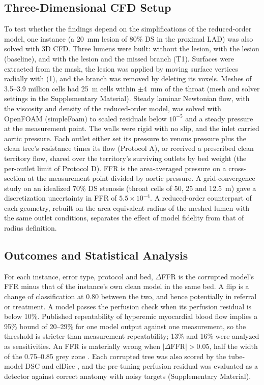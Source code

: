 \documentclass[journal,twoside,web]{ieeecolor}
\begin{document}
\subsection{Three-Dimensional CFD Setup}
To test whether the findings depend on the simplifications of the reduced-order model, one instance (a 20~mm lesion
of 80\% DS in the proximal LAD) was also solved with 3D CFD. Three lumens were built: without the lesion, with the lesion (baseline), and with the
lesion and the missed branch (T1). Surfaces were extracted from the mask, the
lesion was applied by moving surface vertices radially with (1), and the branch was removed by deleting its voxels.
Meshes of 3.5--3.9 million cells had 25~\textmu m cells within $\pm 4$~mm of the throat (mesh and solver settings in the Supplementary Material).
Steady laminar Newtonian flow, with the viscosity and density of the reduced-order model, was solved with OpenFOAM
(simpleFoam) to scaled residuals below $10^{-5}$ and a steady pressure at the measurement
point. The walls were rigid with no slip, and the inlet carried aortic pressure. Each outlet either set its pressure
to venous pressure plus the clean tree's resistance times its flow (Protocol A), or received a prescribed clean
territory flow, shared over the territory's surviving outlets by bed weight (the per-outlet limit of Protocol D). FFR
is the area-averaged pressure on a cross-section at the measurement point divided by aortic pressure. A
grid-convergence study on an idealized 70\% DS stenosis (throat cells of 50, 25 and 12.5~\textmu m) gave a
discretization uncertainty in FFR of $5.5\times10^{-4}$. A reduced-order counterpart of each geometry, rebuilt on the
area-equivalent radius of the meshed lumen with the same outlet conditions, separates the effect of model fidelity
from that of radius definition.

\subsection{Outcomes and Statistical Analysis}
For each instance, error type, protocol and bed, $\Delta$FFR is the corrupted model's FFR minus that of the
instance's own clean model in the same bed. A flip is a change of classification at 0.80 between the two, and hence potentially
in referral or treatment. A model passes the perfusion check when its perfusion residual is below 10\%.
Published repeatability of hyperemic myocardial blood flow \cite{schindler2023,brown2018} implies a 95\% bound of
20--29\% for one model output against one measurement, so the threshold is stricter than measurement repeatability;
13\% and 16\% were analyzed as sensitivities. An FFR is materially wrong when $|\Delta\mathrm{FFR}| > 0.05$, half the width of the 0.75--0.85 grey zone
\cite{petraco2013}. Each corrupted tree was also scored by the tube-model DSC and clDice \cite{shit2021}, and the
pre-tuning perfusion residual was evaluated as a detector against correct anatomy with noisy targets
(Supplementary Material).
\end{document}
